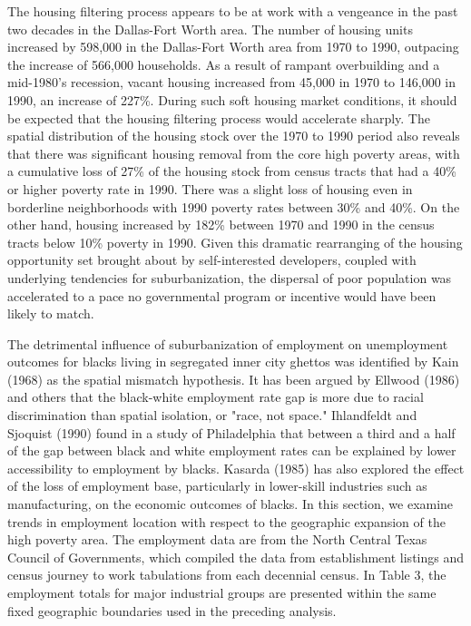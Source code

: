 \documentclass[12pt,a4paper]{article}
\begin{document}
The housing filtering process appears to be at work with a
vengeance in the past two decades in the Dallas-Fort Worth area.
The number of housing units increased by 598,000 in the
Dallas-Fort Worth area from 1970 to 1990, outpacing the increase
of 566,000 households. As a result of rampant overbuilding and a
mid-1980's recession, vacant housing increased from 45,000 in 1970
to 146,000 in 1990, an increase of 227\%. During such soft housing
market conditions, it should be expected that the housing
filtering process would accelerate sharply. The spatial
distribution of the housing stock over the 1970 to 1990 period
also reveals that there was significant housing removal from the
core high poverty areas, with a cumulative loss of 27\% of the
housing stock from census tracts that had a 40\% or higher poverty
rate in 1990. There was a slight loss of housing even in
borderline neighborhoods with 1990 poverty rates between 30\% and
40\%. On the other hand, housing increased by 182\% between 1970
and 1990 in the census tracts below 10\% poverty in 1990. Given
this dramatic rearranging of the housing opportunity set brought
about by self-interested developers, coupled with underlying
tendencies for suburbanization, the dispersal of poor population
was accelerated to a pace no governmental program or incentive
would have been likely to match.

The detrimental influence of suburbanization of employment on
unemployment outcomes for blacks living in segregated inner city
ghettos was identified by Kain (1968) as the spatial mismatch
hypothesis. It has been argued by Ellwood (1986) and others that
the black-white employment rate gap is more due to racial
discrimination than spatial isolation, or "race, not space."
Ihlandfeldt and Sjoquist (1990) found in a study of Philadelphia
that between a third and a half of the gap between black and white
employment rates can be explained by lower accessibility to
employment by blacks.  Kasarda (1985) has also explored the effect
of the loss of  employment base, particularly in lower-skill
industries such as manufacturing, on the economic outcomes of
blacks. In this section, we examine trends in employment location
with respect to the geographic expansion of the high poverty area.
The employment data are from the North Central Texas Council of
Governments, which compiled the data from establishment listings
and census journey to work tabulations from each decennial census.
In Table 3, the employment totals for major industrial groups are
presented within the same fixed geographic boundaries used in the
preceding analysis.
\end{document}
